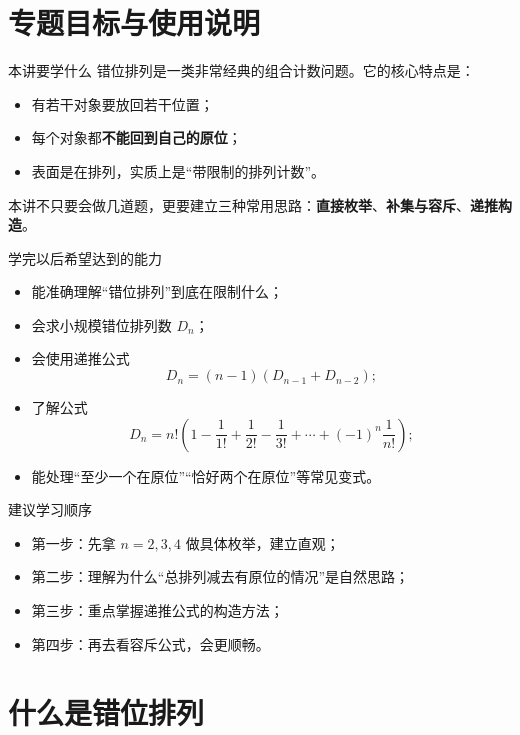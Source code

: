 \documentclass[11pt,a4paper,fontset=fandol]{ctexart}
\theoremstyle{formaltheorem}
\theoremstyle{formalexample}
\newcommand{\Dn}{D_n}
\begin{document}
\pagestyle{plain}
\tableofcontents
\newpage
\pagestyle{fancy}

\section{专题目标与使用说明}

\begin{goalbox}{本讲要学什么}
错位排列是一类非常经典的组合计数问题。它的核心特点是：
\begin{itemize}
  \item 有若干对象要放回若干位置；
  \item 每个对象都\textbf{不能回到自己的原位}；
  \item 表面是在排列，实质上是“带限制的排列计数”。
\end{itemize}
本讲不只要会做几道题，更要建立三种常用思路：\textbf{直接枚举}、\textbf{补集与容斥}、\textbf{递推构造}。
\end{goalbox}

\begin{goalbox}{学完以后希望达到的能力}
\begin{itemize}
  \item 能准确理解“错位排列”到底在限制什么；
  \item 会求小规模错位排列数 $\Dn$；
  \item 会使用递推公式
  \[
  \Dn=(n-1)(D_{n-1}+D_{n-2});
  \]
  \item 了解公式
  \[
  \Dn=n!\left(1-\frac1{1!}+\frac1{2!}-\frac1{3!}+\cdots+(-1)^n\frac1{n!}\right);
  \]
  \item 能处理“至少一个在原位”“恰好两个在原位”等常见变式。
\end{itemize}
\end{goalbox}

\begin{notebox}{建议学习顺序}
\begin{itemize}
  \item 第一步：先拿 $n=2,3,4$ 做具体枚举，建立直观；
  \item 第二步：理解为什么“总排列减去有原位的情况”是自然思路；
  \item 第三步：重点掌握递推公式的构造方法；
  \item 第四步：再去看容斥公式，会更顺畅。
\end{itemize}
\end{notebox}

\section{什么是错位排列}
\end{document}
